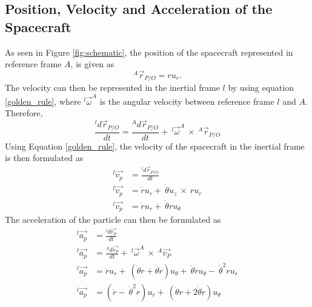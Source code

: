 \documentclass[]{article}
\begin{document}
\subsection{Position, Velocity and Acceleration of the Spacecraft}
As seen in Figure \ref{fig:schematic}, the position of the spacecraft represented in reference frame \(A\), is given as 
\begin{equation} \label{position}
	^A\vec{r}_{P/O} = ru_{r}.
\end{equation}
The velocity can then be represented in the inertial frame \(l\) by using equation \ref{golden_rule}, where \(^l\vec{\omega}^A\) is the angular velocity between reference frame \(l\) and \(A\). Therefore, 
\begin{equation} \label{golden_rule}
	\frac{^ld\vec{r}_{P/O}}{dt} = \frac{^Ad\vec{r}_{P/O}}{dt} +\ ^l\vec{\omega}^A\  \times\  ^A\vec{r}_{P/O} 
\end{equation}
Using Equation \ref{golden_rule}, the velocity of the spacecraft in the inertial frame is then formulated as
\begin{align}
	^l\vec{v_{p}} &= \frac{^ld\vec{r}_{P/O}}{dt} \nonumber\\
	^l\vec{v_{p}} &= \dot{r}u_{r} +\ \dot{\theta}u_{z}\ \times\ ru_{r} \nonumber\\
	^l\vec{v_{p}} &= \dot{r}u_{r} +\ \dot{\theta}ru_{\theta} \label{velocity}
\end{align}
The acceleration of the particle can then be formulated as 
\begin{align}
    ^l\vec{a_{p}} &= \frac{^ld\vec{v_{P}}}{dt} \nonumber\\
	^l\vec{a_{p}} &= \frac{^Ad\vec{v_{P}}}{dt} +\ ^l\vec{\omega}^A\  \times\  ^A\vec{v_{P}} \nonumber\\
	^l\vec{a_{p}} &= \ddot{r}u_{r} +\ (\ddot{\theta}r+\dot{\theta}\dot{r})u_{\theta} +\ \dot{\theta}\dot{r}u_{\theta} -\ \dot{\theta}^2ru_{r} \nonumber\\
	^l\vec{a_{p}} &= (\ddot{r} -\ \dot{\theta}^2r)u_{r} +\ (\ddot{\theta}r+2\dot{\theta}\dot{r})u_{\theta}   \label{acceleration}
\end{align}

\end{document}
